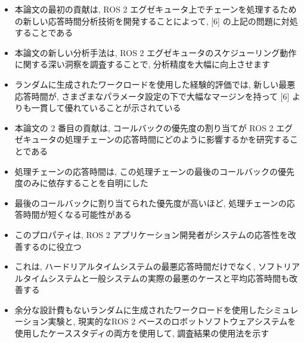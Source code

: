 \begin{frame}{}
    \begin{itemize}
        \item 本論文の最初の貢献は, ROS 2 エグゼキュータ上でチェーンを処理するための新しい応答時間分析技術を開発することによって, [6] の上記の問題に対処することである
        \item 本論文の新しい分析手法は, ROS 2 エグゼキュータのスケジューリング動作に関する深い洞察を調査することで, 分析精度を大幅に向上させます
        \item ランダムに生成されたワークロードを使用した経験的評価では, 新しい最悪応答時間が, さまざまなパラメータ設定の下で大幅なマージンを持って [6] よりも一貫して優れていることが示されている
    \end{itemize}
\end{frame}

\begin{frame}{}
    \begin{itemize}
        \item 本論文の 2 番目の貢献は, コールバックの優先度の割り当てが ROS 2 エグゼキュータの処理チェーンの応答時間にどのように影響するかを研究することである
        \item 処理チェーンの応答時間は, この処理チェーンの最後のコールバックの優先度のみに依存することを自明にした
        \item 最後のコールバックに割り当てられた優先度が高いほど, 処理チェーンの応答時間が短くなる可能性がある
        \item このプロパティは, ROS 2 アプリケーション開発者がシステムの応答性を改善するのに役立つ
        \item これは, ハードリアルタイムシステムの最悪応答時間だけでなく, ソフトリアルタイムシステムと一般システムの実際の最悪のケースと平均応答時間も改善する
        \item 余分な設計費もないランダムに生成されたワークロードを使用したシミュレーション実験と, 現実的なROS 2 ベースのロボットソフトウェアシステムを使用したケーススタディの両方を使用して, 調査結果の使用法を示す
    \end{itemize}
\end{frame}
